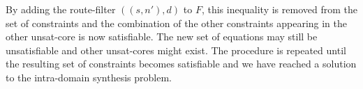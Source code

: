By adding the route-filter $((s,n'),d)$ to $F$, this inequality is removed from the set of constraints
and the combination of the other constraints appearing in the other unsat-core is now satisfiable.
The new set of equations may still be unsatisfiable and other unsat-cores might exist. 
The procedure is repeated until the resulting set of constraints becomes satisfiable
and we have reached a solution to the intra-domain synthesis problem.


